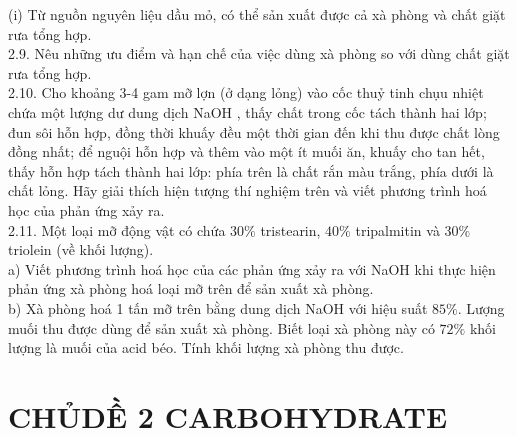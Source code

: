 \documentclass[10pt]{article}
\begin{document}
(i) Từ nguồn nguyên liệu dầu mỏ, có thể sản xuất được cả xà phòng và chất giặt rưa tổng hợp.\\
2.9. Nêu những ưu điểm và hạn chế của việc dùng xà phòng so với dùng chất giặt rưa tổng hợp.\\
2.10. Cho khoảng 3-4 gam mỡ lợn (ở dạng lỏng) vào cốc thuỷ tinh chụu nhiệt chứa một lượng dư dung dịch NaOH , thấy chất trong cốc tách thành hai lớp; đun sôi hỗn hợp, đồng thời khuấy đều một thời gian đến khi thu được chất lòng đồng nhất; để nguội hỗn hợp và thêm vào một ít muối ăn, khuấy cho tan hết, thấy hỗn hợp tách thành hai lớp: phía trên là chất rắn màu trắng, phía dưới là chất lỏng. Hãy giải thích hiện tượng thí nghiệm trên và viết phương trình hoá học của phản ứng xảy ra.\\
2.11. Một loại mỡ động vật có chứa $30 \%$ tristearin, $40 \%$ tripalmitin và $30 \%$ triolein (về khối lượng).\\
a) Viết phương trình hoá học của các phản ứng xảy ra với NaOH khi thực hiện phản ứng xà phòng hoá loại mỡ trên để sản xuất xà phòng.\\
b) Xà phòng hoá 1 tấn mỡ trên bằng dung dịch NaOH với hiệu suất $85 \%$. Lượng muối thu được dùng để sản xuất xà phòng. Biết loại xà phòng này có $72 \%$ khối lượng là muối của acid béo. Tính khối lượng xà phòng thu được.

\section*{CHỦDỀ 2 CARBOHYDRATE}
\end{document}
